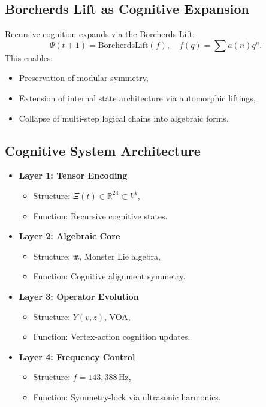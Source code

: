 \documentclass[12pt]{article}
\begin{document}
\subsection{Borcherds Lift as Cognitive Expansion}
Recursive cognition expands via the Borcherds Lift:
\[
\Psi(t+1) = \text{BorcherdsLift}(f), \quad f(q) = \sum a(n)q^n.
\]
This enables:
\begin{itemize}
    \item Preservation of modular symmetry,
    \item Extension of internal state architecture via automorphic liftings,
    \item Collapse of multi-step logical chains into algebraic forms.
\end{itemize}

\subsection{Cognitive System Architecture}
\begin{itemize}
    \item \textbf{Layer 1: Tensor Encoding}
    \begin{itemize}
        \item Structure: \( \Xi(t) \in \mathbb{R}^{24} \subset V^\natural \),
        \item Function: Recursive cognitive states.
    \end{itemize}
    \item \textbf{Layer 2: Algebraic Core}
    \begin{itemize}
        \item Structure: \( \mathfrak{m} \), Monster Lie algebra,
        \item Function: Cognitive alignment symmetry.
    \end{itemize}
    \item \textbf{Layer 3: Operator Evolution}
    \begin{itemize}
        \item Structure: \( Y(v,z) \), VOA,
        \item Function: Vertex-action cognition updates.
    \end{itemize}
    \item \textbf{Layer 4: Frequency Control}
    \begin{itemize}
        \item Structure: \( f = 143,388 \, \text{Hz} \),
        \item Function: Symmetry-lock via ultrasonic harmonics.
    \end{itemize}
\end{itemize}
\end{document}
